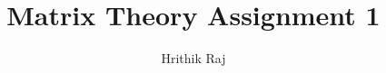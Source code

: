 \documentclass[journal,12pt,twocolumn]{IEEEtran}
\begin{document}
\makeatletter
{}
\makeatother
\let\StandardTheFigure\thefigure
\let\vec\mathbf
\renewcommand{\thefigure}{\theproblem}
\def\putbox#1#2#3{\makebox[0in][l]{\makebox[#1][l]{}\raisebox{\baselineskip}[0in][0in]{\raisebox{#2}[0in][0in]{#3}}}}
     \def\rightbox#1{\makebox[0in][r]{#1}}
     \def\centbox#1{\makebox[0in]{#1}}
     \def\topbox#1{\raisebox{-\baselineskip}[0in][0in]{#1}}
     \def\midbox#1{\raisebox{-0.5\baselineskip}[0in][0in]{#1}}
\vspace{3cm}
\title{Matrix Theory Assignment 1}
\author{Hrithik Raj}
%
%
%
% 
%
\end{document}
